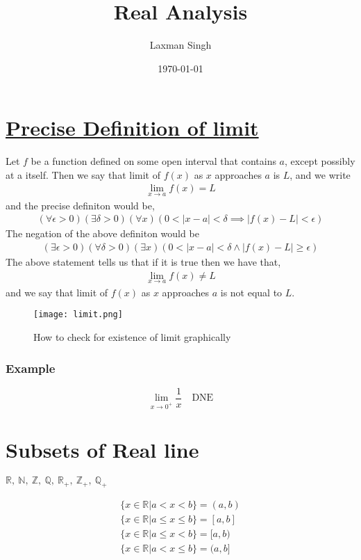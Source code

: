 \documentclass[12pt,a4paper]{article}
\author{Laxman Singh}
\date{\today}
\title{Real Analysis}
\begin{document}
\section*{ \underline{Precise Definition of limit} } 
   Let \(f\) be a function defined on some open interval that contains \(a\), except possibly at a itself. Then we say that limit of \(f(x)\) as \(x\) approaches \(a \)  is \(L\), and we write 
    \begin{align*}
        \lim_{x \to a} f(x) = L 
   \end{align*}    
and the precise definiton would be, 
 \begin{align*}
    \left( \forall \epsilon > 0 \right) \left( \exists \delta > 0 \right)\left( \forall x \right) \left( 0 < |x-a|< \delta \implies |f(x)-L|< \epsilon \right)   
\end{align*}
The negation of the above definiton would be 
 \begin{align*}
    \left( \exists \epsilon > 0 \right) \left( \forall \delta > 0 \right)\left( \exists x \right) \left( 0< |x-a| < \delta \wedge |f(x)-L| \geq \epsilon \right)  
\end{align*}
The above statement tells us that if it is true then we have that,
 \begin{align*}
    \lim_{x \to a} f(x) \neq L
\end{align*}
and we say that limit of \(f(x)\) as \(x\) approaches \(a \)  is  not equal to \(L\).

\begin{figure}[ht]
    \centering
    \texttt{[image: limit.png]}
    \caption{How to check for existence of limit graphically}
\end{figure}
 \subsubsection*{Example} 
 \begin{equation*}
     \lim_{x \to 0^+} \frac{1}{x} \quad \text{DNE}
 \end{equation*}    

\section{Subsets of Real line}
\(\mathbb{R}, \ \mathbb{N}, \ \mathbb{Z}, \ \mathbb{Q}, \ \mathbb{R}_{+}, \ \mathbb{Z}_{+}, \ \mathbb{Q}_{+}\)

 \begin{align*}
    \{x \in \mathbb{R} | a < x < b \}  = \left( a,b \right) \\
    \{x \in \mathbb{R} | a \leq x \leq b \}  = \left[ a,b \right] \\
    \{x \in \mathbb{R} | a \leq x < b \}  = [ a,b ) \\
    \{x \in \mathbb{R} | a < x \leq b \}  = ( a,b ] \\
\end{align*}
\end{document}
